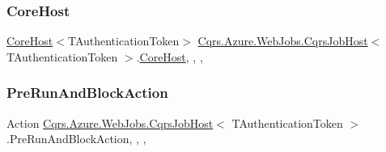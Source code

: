 \subsubsection{\texorpdfstring{Core\+Host}{CoreHost}}
{\footnotesize\ttfamily \hyperlink{classCqrs_1_1Hosts_1_1CoreHost}{Core\+Host}$<$T\+Authentication\+Token$>$ \hyperlink{classCqrs_1_1Azure_1_1WebJobs_1_1CqrsJobHost}{Cqrs.\+Azure.\+Web\+Jobs.\+Cqrs\+Job\+Host}$<$ T\+Authentication\+Token $>$.\hyperlink{classCqrs_1_1Hosts_1_1CoreHost}{Core\+Host}\hspace{0.3cm}{\ttfamily [static]}, {\ttfamily [get]}, {\ttfamily [set]}, {\ttfamily [protected]}}

\mbox{\label{classCqrs_1_1Azure_1_1WebJobs_1_1CqrsJobHost_afd124af2c14bb654b6fefd6842ceebeb_afd124af2c14bb654b6fefd6842ceebeb}} 
\subsubsection{\texorpdfstring{Pre\+Run\+And\+Block\+Action}{PreRunAndBlockAction}}
{\footnotesize\ttfamily Action \hyperlink{classCqrs_1_1Azure_1_1WebJobs_1_1CqrsJobHost}{Cqrs.\+Azure.\+Web\+Jobs.\+Cqrs\+Job\+Host}$<$ T\+Authentication\+Token $>$.Pre\+Run\+And\+Block\+Action\hspace{0.3cm}{\ttfamily [static]}, {\ttfamily [get]}, {\ttfamily [set]}, {\ttfamily [protected]}}

